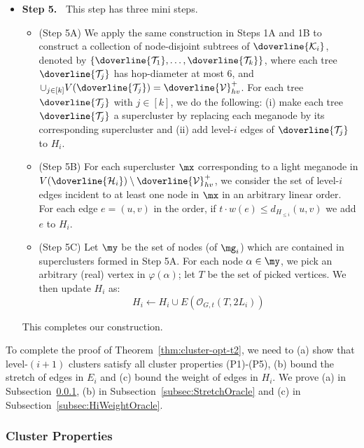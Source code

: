 \begin{itemize}
	\item \textbf{Step 5.~} This step has three mini steps.
	\begin{itemize}
		\item (Step 5A) We apply the same construction in Steps 1A and 1B to construct a collection of node-disjoint subtrees of $\doverline{\mathcal{K}_i}$, denoted by $\{\doverline{\mathcal{T}_1}, \ldots, \doverline{\mathcal{T}_k}\}$, where  each tree $\doverline{\mathcal{T}_j}$ has hop-diameter at most 6, and  $\cup_{j\in [k]}V(\doverline{\mathcal{T}_j}) = \doverline{\mathcal{V}}^+_{hv}$. For each tree  $\doverline{\mathcal{T}_j}$ with $j\in [k]$, we do the following: (i) make each tree $\doverline{\mathcal{T}_j}$ a supercluster by replacing each meganode by its corresponding supercluster and  (ii)  add level-$i$ edges of $\doverline{\mathcal{T}_j}$ to $H_i$.
		
		\item (Step 5B) For each supercluster $\mx$ corresponding to a light meganode in  $V(\doverline{\mathcal{H}_i})\setminus \doverline{\mathcal{V}}^+_{hv}$, we consider the set of level-$i$ edges incident to at least one node in $\mx$ in an arbitrary linear order. For each edge $e = (u,v)$ in the order, if $t\cdot w(e)\leq d_{H_{\leq i}}(u,v)$ we add $e$ to $H_i$.	
		
		\item (Step 5C) Let $\my$ be the set of nodes (of $\mg_i$) which are contained in superclusters formed in Step 5A.  For each node $\alpha\in \my$, we pick an arbitrary (real) vertex in $\varphi(\alpha)$; let $T$ be the set of picked vertices. We then update $H_i$ as:
		\begin{equation}\label{eq:add-oracle-refined}
		H_i\leftarrow H_i\cup E(\mathcal{O}_{G,t}(T,2L_i))
		\end{equation}
	\end{itemize}
	This completes our construction.
\end{itemize}


To complete the proof of Theorem~\ref{thm:cluster-opt-t2}, we need to (a) show that level-$(i+1)$ clusters satisfy all cluster properties (P1)-(P5),  (b) bound the stretch of edges in $E_i$ and (c) bound the weight of edges in $H_i$.  We prove (a) in Subsection~\ref{subsec:ClusterPropOracle}, (b) in Subsection~\ref{subsec:StretchOracle} and (c) in Subsection~\ref{subsec:HiWeightOracle}.


\subsubsection{Cluster Properties}\label{subsec:ClusterPropOracle}


